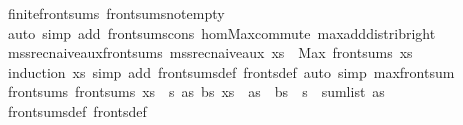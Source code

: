 \begin{isabellebody}
%
\isatagproof
{}\isamarkupfalse%
\ finite{\isacharunderscore}{\kern0pt}front{\isacharunderscore}{\kern0pt}sums\ front{\isacharunderscore}{\kern0pt}sums{\isacharunderscore}{\kern0pt}not{\isacharunderscore}{\kern0pt}empty\isanewline
{}\isamarkupfalse%
\ {\isacharparenleft}{\kern0pt}auto\ simp\ add{\isacharcolon}{\kern0pt}\ front{\isacharunderscore}{\kern0pt}sums{\isacharunderscore}{\kern0pt}cons\ hom{\isacharunderscore}{\kern0pt}Max{\isacharunderscore}{\kern0pt}commute\ max{\isacharunderscore}{\kern0pt}add{\isacharunderscore}{\kern0pt}distrib{\isacharunderscore}{\kern0pt}right{\isacharparenright}{\kern0pt}%
\endisatagproof
{\isafoldproof}%
%
\isadelimproof
\isanewline
%
\endisadelimproof
\isanewline
{}\isamarkupfalse%
\ mss{\isacharunderscore}{\kern0pt}rec{\isacharunderscore}{\kern0pt}naive{\isacharunderscore}{\kern0pt}aux{\isacharunderscore}{\kern0pt}front{\isacharunderscore}{\kern0pt}sums{\isacharcolon}{\kern0pt}\ {\isachardoublequoteopen}mss{\isacharunderscore}{\kern0pt}rec{\isacharunderscore}{\kern0pt}naive{\isacharunderscore}{\kern0pt}aux\ xs\ {\isacharequal}{\kern0pt}\ Max\ {\isacharparenleft}{\kern0pt}front{\isacharunderscore}{\kern0pt}sums\ xs{\isacharparenright}{\kern0pt}{\isachardoublequoteclose}\isanewline
%
\isadelimproof
%
\endisadelimproof
%
\isatagproof
{}\isamarkupfalse%
\ {\isacharparenleft}{\kern0pt}induction\ xs{\isacharparenright}{\kern0pt}\ {\isacharparenleft}{\kern0pt}simp\ add{\isacharcolon}{\kern0pt}\ front{\isacharunderscore}{\kern0pt}sums{\isacharunderscore}{\kern0pt}def\ fronts{\isacharunderscore}{\kern0pt}def{\isacharcomma}{\kern0pt}\ auto\ simp{\isacharcolon}{\kern0pt}\ max{\isacharunderscore}{\kern0pt}front{\isacharunderscore}{\kern0pt}sum{\isacharparenright}{\kern0pt}%
\endisatagproof
{\isafoldproof}%
%
\isadelimproof
\isanewline
%
\endisadelimproof
\isanewline
{}\isamarkupfalse%
\ front{\isacharunderscore}{\kern0pt}sums{\isacharcolon}{\kern0pt}\ {\isachardoublequoteopen}front{\isacharunderscore}{\kern0pt}sums\ xs\ {\isacharequal}{\kern0pt}\ {\isacharbraceleft}{\kern0pt}s{\isachardot}{\kern0pt}\ {\isasymexists}as\ bs{\isachardot}{\kern0pt}\ xs\ {\isacharequal}{\kern0pt}\ as\ {\isacharat}{\kern0pt}\ bs\ {\isasymand}\ s\ {\isacharequal}{\kern0pt}\ sum{\isacharunderscore}{\kern0pt}list\ as{\isacharbraceright}{\kern0pt}{\isachardoublequoteclose}\isanewline
%
\isadelimproof
%
\endisadelimproof
%
\isatagproof
{}\isamarkupfalse%
\ front{\isacharunderscore}{\kern0pt}sums{\isacharunderscore}{\kern0pt}def\ fronts{\isacharunderscore}{\kern0pt}def\ \isamarkupfalse%

\end{isabellebody}
